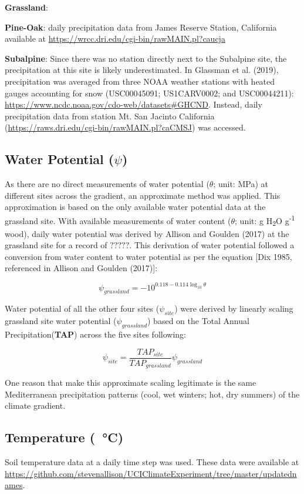 \documentclass[letterpaper, 10pt]{article}
\begin{document}
\textbf{Grassland}:

\textbf{Pine-Oak}: daily precipitation data from James Reserve Station, California available at \url{https://wrcc.dri.edu/cgi-bin/rawMAIN.pl?caucja}

\textbf{Subalpine}: Since there was no station directly next to the Subalpine site, the precipitation at this site is likely underestimated. In Glassman et al. (2019), precipitation was averaged from three NOAA weather stations with heated gauges accounting for snow (USC00045091; US1CARV0002; and USC00044211): \url{https://www.ncdc.noaa.gov/cdo-web/datasets#GHCND}. Instead, daily precipitation data from station Mt. San Jacinto California (\url{https://raws.dri.edu/cgi-bin/rawMAIN.pl?caCMSJ}) was accessed.


\subsection{Water Potential ($\psi$)}
As there are no direct measurements of water potential ($\theta$; unit: MPa) at different sites across the gradient, an approximate method was applied. This approximation is based on the only available water potential data at the grassland site. With available measurements of water content ($\theta$; unit: g H\textsubscript{2}O g\textsuperscript{-1} wood), daily water potential was derived by Allison and Goulden (2017) at the grassland site for a record of $?????$. This derivation of water potential followed a conversion from water content to water potential as per the equation [Dix 1985, referenced in Allison and Goulden (2017)]:

\begin{equation}
  \psi_{grassland} = -10^{0.118-0.114\log_{10} \theta}
\end{equation}

Water potential of all the other four sites ($\psi_{site}$) were derived by linearly scaling grassland site water potential ($\psi_{grassland}$) based on the Total Annual Precipitation(\textbf{TAP}) across the five sites following:

\begin{equation}
  \psi_{site} = \frac{TAP_{site}}{TAP_{grassland}} \psi_{grassland}
\end{equation}

One reason that make this approximate scaling legitimate is the same Mediterranean precipitation patterns (cool, wet winters; hot, dry summers) of the climate gradient.

\subsection{Temperature (\SI{}{\celsius})}
Soil temperature data at a daily time step was used. These data were available at \url{https://github.com/stevenallison/UCIClimateExperiment/tree/master/updatednames}. 
\end{document}
